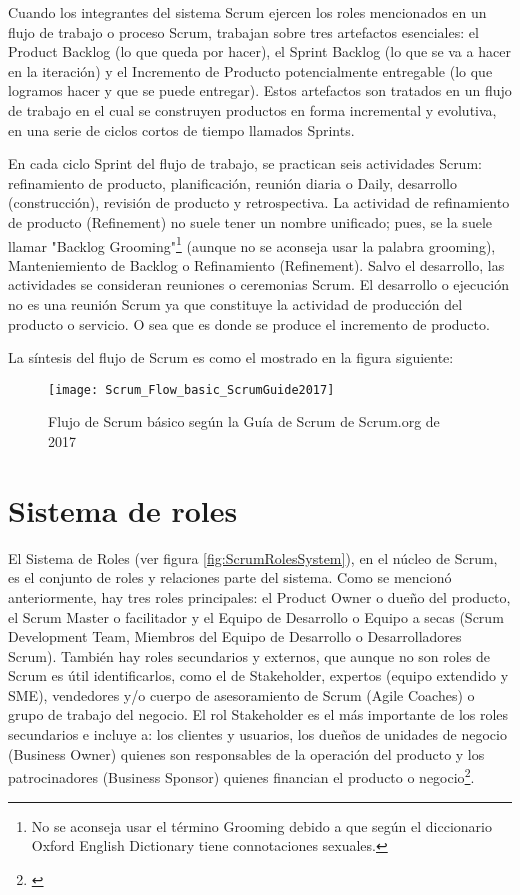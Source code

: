 Cuando los integrantes del sistema Scrum ejercen los roles mencionados en un flujo de trabajo o proceso Scrum, trabajan sobre tres artefactos esenciales: el Product Backlog (lo que queda por hacer), el Sprint Backlog (lo que se va a hacer en la iteración) y el Incremento de Producto potencialmente entregable (lo que logramos hacer y que se puede entregar). Estos artefactos son tratados en un flujo de trabajo en el cual se construyen productos en forma incremental y evolutiva, en una serie de ciclos cortos de tiempo llamados Sprints. 

En cada ciclo Sprint del flujo de trabajo, se practican seis actividades Scrum: refinamiento de producto, planificación, reunión diaria o Daily, desarrollo (construcción), revisión de producto y retrospectiva. La actividad de refinamiento de producto (Refinement) no suele tener un nombre unificado; pues, se la suele llamar "Backlog Grooming"\footnote{No se aconseja usar el término Grooming debido a que según el diccionario Oxford English Dictionary tiene connotaciones sexuales.} (aunque no se aconseja usar la palabra grooming), Manteniemiento de Backlog o Refinamiento (Refinement). Salvo el desarrollo, las actividades se consideran reuniones o ceremonias Scrum. El desarrollo o ejecución no es una reunión Scrum ya que constituye la actividad de producción del producto o servicio. O sea que es donde se produce el incremento de producto.

La síntesis del flujo de Scrum es como el mostrado en la figura siguiente:

\begin{figure}[h]
  \centering
  \texttt{[image: Scrum\_Flow\_basic\_ScrumGuide2017]}
  \caption{Flujo de Scrum básico según la Guía de Scrum de Scrum.org de 2017}
  \centering
  \label{fig:Scrum_Flow_basic_ScrumGuide2017} %
\end{figure}

\section{Sistema de roles}

El Sistema de Roles (ver figura \ref{fig:ScrumRolesSystem}), en el núcleo de Scrum, es el conjunto de roles y relaciones parte del sistema. Como se mencionó anteriormente, hay tres roles principales: el Product Owner o dueño del producto, el Scrum Master o facilitador y el Equipo de Desarrollo o Equipo a secas (Scrum Development Team, Miembros del Equipo de Desarrollo o Desarrolladores Scrum). También hay roles secundarios y externos, que aunque no son roles de Scrum es útil identificarlos, como el de Stakeholder, expertos (equipo extendido y SME), vendedores y/o cuerpo de asesoramiento de Scrum (Agile Coaches) o grupo de trabajo del negocio. El rol Stakeholder es el más importante de los roles secundarios e incluye a: los clientes y usuarios, los dueños de unidades de negocio (Business Owner) quienes son responsables de la operación del producto y los patrocinadores (Business Sponsor) quienes financian el producto o negocio\footnote{\cite{SBOK-2013}}.

